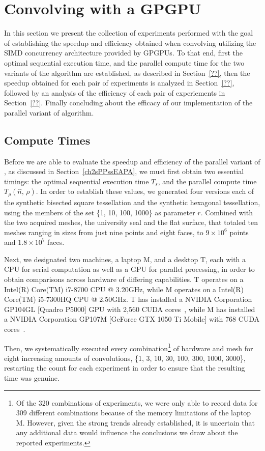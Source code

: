 \section{Convolving with a GPGPU}
\label{ch6sCWG}
In this section we present the collection of experiments performed with the goal of establishing the speedup and efficiency obtained when convolving  utilizing the \gls{SIMD} concurrency architecture provided by \glspl{GPGPU}. To that end, first the optimal sequential execution time, and the parallel compute time for the two variants of the  algorithm are established, as described in Section~\ref{??}, then the speedup obtained for each pair of experiments is analyzed in Section~\ref{??}, followed by an analysis of the efficiency of each pair of experiements in Section~\ref{??}. Finally concluding about the efficacy of our implementation of the parallel variant of  algorithm.

%
%
%
%
\subsection{Compute Times}
\label{ch6sCWGssCT}
Before we are able to evaluate the \gls{speedup} and \gls{efficiency} of the parallel variant of , as discussed in Section~\ref{ch2sPPssEAPA}, we must first obtain two essential timings: the optimal sequential execution time $\mathit{T_s}$, and the parallel compute time $\mathit{T_{\rho}}(\hat{n},\,\rho)$. In order to establish these values, we generated four versions each of the synthetic bisected square tessellation and the synthetic hexagonal tessellation, using the members of the set \{1, 10, 100, 1000\} as parameter $r$. Combined with the two acquired meshes, the university seal and the flat surface, that totaled ten meshes ranging in sizes from just nine points and eight faces, to $9\times 10^6$ points and $1.8\times 10^7$ faces.

Next, we designated two machines, a laptop M, and a desktop T, each with a CPU for serial computation as well as a GPU for parallel processing, in order to obtain comparisons across hardware of differing capabilities. T operates on a Intel(R) Core(TM) i7-8700 CPU @ 3.20GHz, while M operates on a Intel(R) Core(TM) i5-7300HQ CPU @ 2.50GHz. T has installed a NVIDIA Corporation GP104GL [Quadro P5000] GPU with 2,560 CUDA cores~\cite{quadro5k}, while M has installed a NVIDIA Corporation GP107M [GeForce GTX 1050 Ti Mobile] with 768 CUDA cores~\cite{geforce1050}.

Then, we systematically executed every combination\footnote{Of the 320  combinations of experiments, we were only able to record data for 309 different combinations because of the memory limitations of the laptop M. However, given the strong trends already established, it is uncertain that any additional data would influence the conclusions we draw about the reported experiments.} of hardware and mesh for eight increasing amounts of convolutions, \{1, 3, 10, 30, 100, 300, 1000, 3000\}, restarting the count for each experiment in order to ensure that the resulting time was genuine. 

